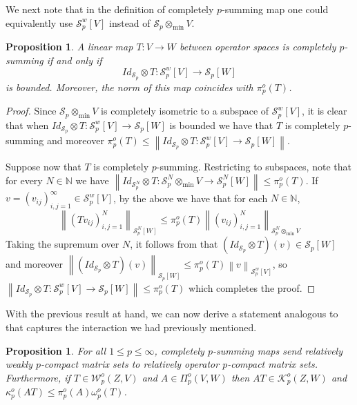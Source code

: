 \documentclass[11pt]{amsart}
\newcommand{\n}[1]{ \left\|#1\right\| }
\newcommand{\N}{{\mathbb{N}}}
\newtheorem{proposition}[theorem]{Proposition}
\numberwithin{equation}{section}
\begin{document}
We next note that in the definition of completely $p$-summing map one could equivalently use $\mathcal{S}_p^w[V]$ instead of $\mathcal{S}_p \otimes_{\min} V$.

\begin{proposition}\label{prop-p-summing-with-Sp-weak}
A linear map $T : V \to W$ between operator spaces is completely $p$-summing if and only if
\[
Id_{\mathcal{S}_p}\otimes T : \mathcal{S}_p^w[V] \to \mathcal{S}_p[W]
\]
is bounded. Moreover, the norm of this map coincides with $\pi_p^o(T)$.
\end{proposition}

\begin{proof}
Since $\mathcal{S}_p \otimes_{\min} V$ is completely isometric to a subspace of $\mathcal{S}_p^w[V]$, it is clear that when ${Id_{\mathcal{S}_p}\otimes T : \mathcal{S}_p^w[V] \to \mathcal{S}_p[W]}$ is bounded we have that $T$ is completely $p$-summing and moreover $\pi_p^o(T) \le \n{Id_{\mathcal{S}_p}\otimes T : \mathcal{S}_p^w[V] \to \mathcal{S}_p[W]}$.

Suppose now that $T$ is completely $p$-summing.
Restricting to subspaces, note that for every $N\in\N$ we have $\n{Id_{\mathcal{S}_p^N}\otimes T : \mathcal{S}_p^N \otimes_{\min} V \to \mathcal{S}_p^N[W]} \le \pi_p^o(T)$.
If $v=(v_{ij})_{i,j=1}^\infty \in \mathcal{S}_p^w[V]$, by the above we have that for each $N\in\N$,
\[
\n{(Tv_{ij})_{i,j=1}^N}_{\mathcal{S}_p^N[W]} \le \pi_p^o(T) \n{(v_{ij})_{i,j=1}^N}_{\mathcal{S}_p^N \otimes_{\min} V}
\]
Taking the supremum over $N$, it follows from \cite[Lem. 1.12]{Pisier-Asterisque} that $(Id_{\mathcal{S}_p} \otimes T)(v) \in \mathcal{S}_p[W]$ and moreover
$\n{(Id_{\mathcal{S}_p} \otimes T)(v)}_{\mathcal{S}_p[W]} \le \pi_p^o(T) \n{v}_{\mathcal{S}_p^w[V]}$, so
$\n{Id_{\mathcal{S}_p}\otimes T : \mathcal{S}_p^w[V] \to \mathcal{S}_p[W]} \le \pi_p^o(T)$
which completes the proof.
\end{proof}


With the previous result at hand, we can now derive a statement analogous to \cite[Prop. 5.4]{Sinha-Karn} that captures the interaction we had previously mentioned.

\begin{proposition}\label{prop-p-summing-maps-weakly-p-compact-to-p-compact}
For all $1\le p \le \infty$, completely $p$-summing maps send relatively weakly $p$-compact matrix sets to relatively operator $p$-compact matrix sets.
Furthermore, if $T \in \mathcal{W}_p^o(Z,V)$ and $A \in \Pi_p^o(V,W)$ then $AT \in \mathcal{K}_p^o(Z,W)$ and $\kappa_p^o(AT) \le \pi_p^o(A)\omega_p^o(T)$.
\end{proposition}
\end{document}
